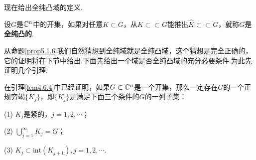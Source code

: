 现在给出全纯凸域的定义.
\begin{definition}\label{def5.1.9}
	设$G$是$\mathbb C^n$中的开集，如果对任意$K\subset G$，从$K\subset\subset G$能推出$\widehat{K}\subset\subset G$，就称$G$是\textbf{全纯凸的}.
\end{definition}
从命题\ref{prop5.1.6}我们自然猜想到全纯域就是全纯凸域，这个猜想是完全正确的，它的证明将在下节中给出.下面先给出一个域是否全纯凸域的充分必要条件.为此先证明几个引理.

在引理\ref{lem4.6.4}中已经证明，如果$G\subset\mathbb C^n$是一个开集，那么一定存在$G$的一个正规穷竭$\{K_j\}$，即$\{K_j\}$是满足下面三个条件的$G$的一列子集：

(1)
$K_j$是紧的，$j=1,2,\cdots$；

(2)
$\bigcup\limits_{j=1}^\infty K_j=G$；

(3)
$K_j\subset\mathrm{int}(K_{j+1}),j=1,2,\cdots$.

